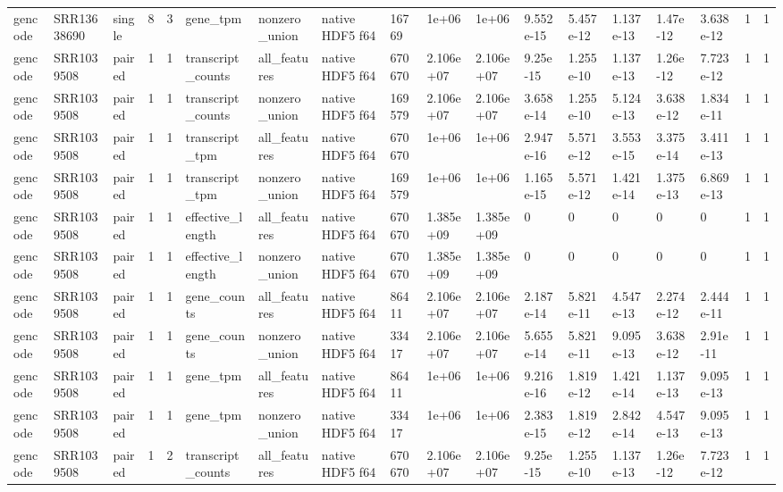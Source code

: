 \begin{tabular}{llllllllllllllllll}
gencode & SRR13638690 & single & 8 & 3 & gene\_tpm & nonzero\_union & native HDF5 f64 & 16769 & 1e+06 & 1e+06 & 9.552e-15 & 5.457e-12 & 1.137e-13 & 1.47e-12 & 3.638e-12 & 1 & 1 \\
gencode & SRR1039508 & paired & 1 & 1 & transcript\_counts & all\_features & native HDF5 f64 & 670670 & 2.106e+07 & 2.106e+07 & 9.25e-15 & 1.255e-10 & 1.137e-13 & 1.26e-12 & 7.723e-12 & 1 & 1 \\
gencode & SRR1039508 & paired & 1 & 1 & transcript\_counts & nonzero\_union & native HDF5 f64 & 169579 & 2.106e+07 & 2.106e+07 & 3.658e-14 & 1.255e-10 & 5.124e-13 & 3.638e-12 & 1.834e-11 & 1 & 1 \\
gencode & SRR1039508 & paired & 1 & 1 & transcript\_tpm & all\_features & native HDF5 f64 & 670670 & 1e+06 & 1e+06 & 2.947e-16 & 5.571e-12 & 3.553e-15 & 3.375e-14 & 3.411e-13 & 1 & 1 \\
gencode & SRR1039508 & paired & 1 & 1 & transcript\_tpm & nonzero\_union & native HDF5 f64 & 169579 & 1e+06 & 1e+06 & 1.165e-15 & 5.571e-12 & 1.421e-14 & 1.375e-13 & 6.869e-13 & 1 & 1 \\
gencode & SRR1039508 & paired & 1 & 1 & effective\_length & all\_features & native HDF5 f64 & 670670 & 1.385e+09 & 1.385e+09 & 0 & 0 & 0 & 0 & 0 & 1 & 1 \\
gencode & SRR1039508 & paired & 1 & 1 & effective\_length & nonzero\_union & native HDF5 f64 & 670670 & 1.385e+09 & 1.385e+09 & 0 & 0 & 0 & 0 & 0 & 1 & 1 \\
gencode & SRR1039508 & paired & 1 & 1 & gene\_counts & all\_features & native HDF5 f64 & 86411 & 2.106e+07 & 2.106e+07 & 2.187e-14 & 5.821e-11 & 4.547e-13 & 2.274e-12 & 2.444e-11 & 1 & 1 \\
gencode & SRR1039508 & paired & 1 & 1 & gene\_counts & nonzero\_union & native HDF5 f64 & 33417 & 2.106e+07 & 2.106e+07 & 5.655e-14 & 5.821e-11 & 9.095e-13 & 3.638e-12 & 2.91e-11 & 1 & 1 \\
gencode & SRR1039508 & paired & 1 & 1 & gene\_tpm & all\_features & native HDF5 f64 & 86411 & 1e+06 & 1e+06 & 9.216e-16 & 1.819e-12 & 1.421e-14 & 1.137e-13 & 9.095e-13 & 1 & 1 \\
gencode & SRR1039508 & paired & 1 & 1 & gene\_tpm & nonzero\_union & native HDF5 f64 & 33417 & 1e+06 & 1e+06 & 2.383e-15 & 1.819e-12 & 2.842e-14 & 4.547e-13 & 9.095e-13 & 1 & 1 \\
gencode & SRR1039508 & paired & 1 & 2 & transcript\_counts & all\_features & native HDF5 f64 & 670670 & 2.106e+07 & 2.106e+07 & 9.25e-15 & 1.255e-10 & 1.137e-13 & 1.26e-12 & 7.723e-12 & 1 & 1 \\

\end{tabular}
